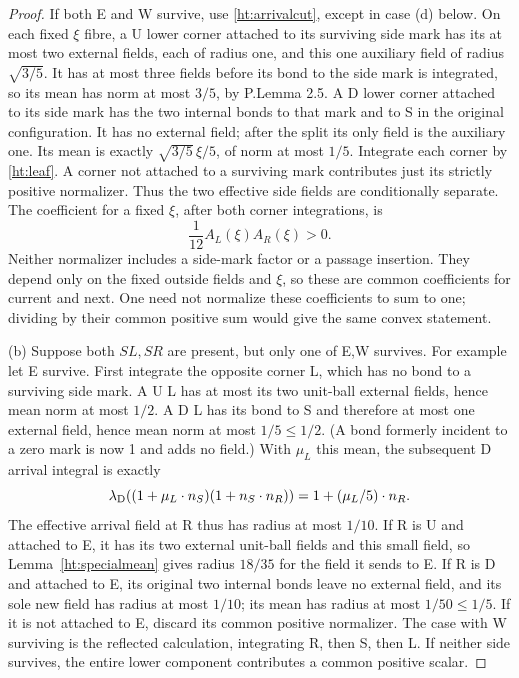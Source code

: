 \begin{proof}
If both E and W survive, use \eqref{ht:arrivalcut}, except in case
(d) below. On each fixed \(\xi\) fibre, a U lower corner attached to
its surviving side mark has its at most two external fields, each of
radius one, and this one auxiliary field of radius \(\sqrt{3/5}\).
It has at most three fields before its bond to the side mark is
integrated, so its mean has norm at most \(3/5\), by P.Lemma 2.5.
A D lower corner attached to its side mark has the two internal bonds
to that mark and to S in the original configuration. It has no external
field; after the split its only field is the auxiliary one. Its mean
is exactly \(\sqrt{3/5}\,\xi/5\), of norm at most \(1/5\).
Integrate each corner by \eqref{ht:leaf}. A corner not attached to a
surviving mark contributes just its strictly positive normalizer.
Thus the two effective side fields are conditionally separate. The
coefficient for a fixed \(\xi\), after both corner integrations, is
\begin{equation}\label{ht:splitweights}
 \frac1{12}A_L(\xi)A_R(\xi)>0.
\end{equation}
Neither normalizer includes a side-mark factor or a passage insertion.
They depend only on the fixed outside fields and \(\xi\), so these
are common coefficients for current and next. One need not normalize
these coefficients to sum to one; dividing by their common positive
sum would give the same convex statement.

(b) Suppose both \(SL,SR\) are present, but only one of E,W survives.
For example let E survive. First integrate the opposite corner L,
which has no bond to a surviving side mark. A U L has at most its two
unit-ball external fields, hence mean norm at most \(1/2\). A D L has
its bond to S and therefore at most one external field, hence mean norm
at most \(1/5\le1/2\). (A bond formerly incident to a zero mark is now
1 and adds no field.) With \(\mu_L\) this mean, the subsequent D
arrival integral is exactly
\begin{equation}\label{ht:onealive}
 \lambda_{\mathrm D}((1+\mu_L\cdot n_S)(1+n_S\cdot n_R))
       =1+(\mu_L/5)\cdot n_R.
\end{equation}
The effective arrival field at R thus has radius at most \(1/10\).
If R is U and attached to E, it has its two external unit-ball fields
and this small field, so Lemma~\ref{ht:specialmean} gives radius
\(18/35\) for the field it sends to E. If R is D and attached to E,
its original two internal bonds leave no external field, and its sole
new field has radius at most \(1/10\); its mean has radius at most
\(1/50\le1/5\). If it is not attached to E, discard its common
positive normalizer. The case with W surviving is the reflected
calculation, integrating R, then S, then L. If neither side survives,
the entire lower component contributes a common positive scalar.


\end{proof}
